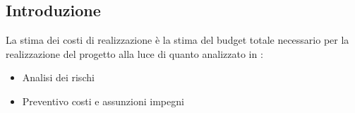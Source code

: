 \subsection{Introduzione}
La stima dei costi di realizzazione è la stima del budget totale necessario per la realizzazione del progetto alla luce di quanto analizzato in :
\begin{itemize}
    \item Analisi dei rischi
    \item Preventivo costi e assunzioni impegni
\end{itemize}
